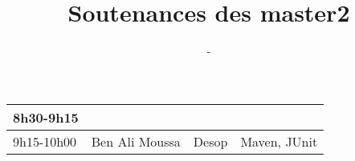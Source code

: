 \documentclass{article}
\title{\huge Soutenances des master2}
\author{\Huge \lemaster}
\date{\huge \ladate - \lasalle}
\begin{document}
\maketitle
\pagestyle{empty}
\Large

\hspace*{-3cm}\begin{tabular}[t]{|l|l|l|l|}\hline
	8h30-9h15&&&\\ \hline
	9h15-10h00&Ben Ali Moussa&Desop&Maven, JUnit\\ \hline
\end{tabular}
\end{document}
